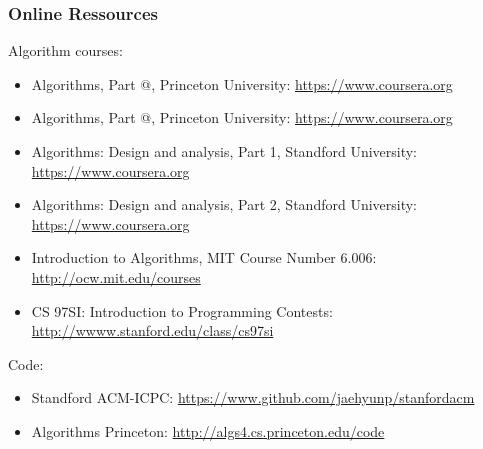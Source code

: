 \documentclass{beamer}
\makeatletter
\newcommand*{\Rmnum}[1]{\expandafter\@slowromancap\romannumeral #1@}
\makeatother
\begin{document}
\begin{frame}%
\frametitle{Online Ressources}

Algorithm courses:

\footnotesize

\begin{itemize}

\item Algorithms, Part \Rmnum{1}, Princeton University: \url{https://www.coursera.org}

\item Algorithms, Part \Rmnum{2}, Princeton University: \url{https://www.coursera.org}

\item Algorithms: Design and analysis, Part 1, Standford University: \url{https://www.coursera.org}

\item Algorithms: Design and analysis, Part 2, Standford University: \url{https://www.coursera.org}

\item Introduction to Algorithms, MIT Course Number 6.006: \url{http://ocw.mit.edu/courses}

\item CS 97SI: Introduction to Programming Contests: \url{http://wwww.stanford.edu/class/cs97si}

\end{itemize}

\normalsize

Code:

\footnotesize

\begin{itemize}

\item Standford ACM-ICPC: \url{https://www.github.com/jaehyunp/stanfordacm}

\item Algorithms Princeton: \url{http://algs4.cs.princeton.edu/code}

\end{itemize}

\end{frame}
\end{document}
